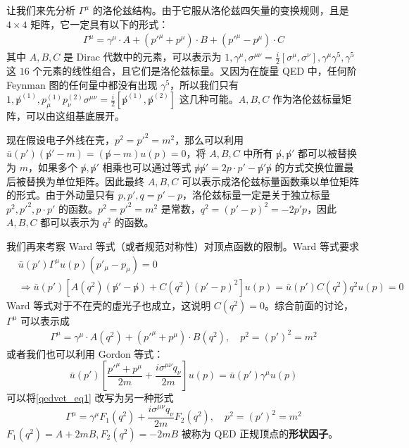 让我们来先分析 $\Gamma^\mu$ 的洛伦兹结构。由于它服从洛伦兹四矢量的变换规则，且是 $4\times 4$ 矩阵，它一定具有以下的形式：
\begin{equation}
\begin{aligned}
\Gamma^\mu=\gamma^\mu\cdot A + ({p'}^\mu + p^\mu)\cdot B + ({p'}^\mu - p^\mu) \cdot C
\end{aligned}
\end{equation}
其中 $A,B,C$ 是 Dirac 代数中的元素，可以表示为 $1,\gamma^\mu,\sigma^{\mu\nu}=\frac{i}{2}[\sigma^\mu,\sigma^\nu],\gamma^\mu\gamma^5,\gamma^5$ 这 $16$ 个元素的线性组合，且它们是洛伦兹标量。又因为在旋量 QED 中，任何阶 Feynman 图的任何量中都没有出现 $\gamma^5$，所以我们只有 $1,\not p^{(1)},p_\mu^{(1)} p_\nu^{(2)} \sigma^{\mu\nu}=\frac{i}{2}[\not p^{(1)},\not p^{(2)}]$ 这几种可能。$A,B,C$ 作为洛伦兹标量矩阵，可以由这组基底展开。

现在假设电子外线在壳，$p^2=p'^2=m^2$，那么可以利用 $\bar u(p')(\not p'-m)= (\not p-m)u(p)=0$，将 $A,B,C$ 中所有 $\not p,\not p'$ 都可以被替换为 $m$，如果多个 $\not p,\not p'$ 相乘也可以通过等式 $\not p\not p'=2p\cdot p'-\not p'\not p$ 的方式交换位置最后被替换为单位矩阵。因此最终 $A,B,C$ 可以表示成洛伦兹标量函数乘以单位矩阵的形式。由于外动量只有 $p,p',q=p'-p$，洛伦兹标量一定是关于独立标量 $p^2,{p'}^2,p\cdot p'$ 的函数。$p^2={p'}^2=m^2$ 是常数，$q^2=(p'-p)^2 = -2p'p$，因此 $A,B,C$ 都可以表示为 $q^2$ 的函数。

我们再来考察 Ward 等式（或者规范对称性）对顶点函数的限制。Ward 等式要求
\begin{equation}
\begin{aligned}
&\bar u(p')\Gamma^\mu u(p) (p'_\mu-p_\mu) = 0\\
&\Rightarrow \bar u(p')\left[A(q^2)(\not p'-\not p)+ C(q^2)(p'-p)^2\right] u(p)=\bar u(p')C(q^2)q^2 u(p)=0
\end{aligned}
\end{equation}
Ward 等式对于不在壳的虚光子也成立，这说明 $C(q^2) = 0$。综合前面的讨论，$\Gamma^\mu$ 可以表示成
\begin{equation}\label{qedvet_eq1}
\begin{aligned}
\Gamma^\mu = \gamma^\mu\cdot A(q^2) + ({p'}^\mu + p^\mu)\cdot B(q^2),\quad p^2=(p')^2=m^2
\end{aligned}
\end{equation}
或者我们也可以利用 Gordon 等式：
\begin{equation}
\bar u(p') \left[\frac{{p'}^\mu+p^\mu}{2m}+\frac{i\sigma^{\mu\nu}q_\nu}{2m}\right]u(p)=\bar u(p')\gamma^\mu u(p)
\end{equation}
可以将\autoref{qedvet_eq1} 改写为另一种形式
\begin{equation}
\Gamma^\mu = \gamma^\mu F_1(q^2) + \frac{i\sigma^{\mu\nu}q_\nu}{2m} F_2(q^2),\quad p^2=(p')^2=m^2
\end{equation}
$F_1(q^2) = A+2mB,F_2(q^2)=-2mB$ 被称为 QED 正规顶点的\textbf{形状因子}。

